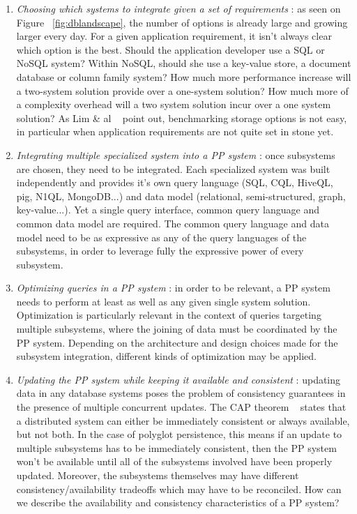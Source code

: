 \begin{enumerate}
\item{\emph{Choosing which systems to integrate given a set of requirements} : as seen on Figure ~\ref{fig:dblandscape}, the number of options is already large and growing larger every day. For a given application requirement, it isn't always clear which option is the best. Should the application developer use a SQL or NoSQL system? Within NoSQL, should she use a key-value store, a document database or column family system? How much more performance increase will a two-system solution provide over a one-system solution? How much more of a complexity overhead will a two system solution incur over a one system solution? As Lim \& al ~\cite{Lim2013}  point out, benchmarking storage options is not easy, in particular when application requirements are not quite set in stone yet.}
\item{\emph{Integrating multiple specialized system into a PP system} : once subsystems are chosen, they need to be integrated. Each specialized system was built independently and provides it's own query language (SQL, CQL, HiveQL, pig, N1QL, MongoDB...) and data model (relational, semi-structured, graph, key-value...). Yet a single query interface, common query language and common data model are required. The common query language and data model need to be as expressive as any of the query languages of the subsystems, in order to leverage fully the expressive power of every subsystem. }
\item{\emph{Optimizing queries in a PP system} :  in order to be relevant, a PP system needs to perform at least as well as any given single system solution. Optimization is particularly relevant in the context of queries targeting multiple subsystems, where the joining of data must be coordinated by the PP system. Depending on the architecture and design choices made for the subsystem integration, different kinds of optimization may be applied.}
\item{\emph{Updating the PP system while keeping it available and consistent} : updating data in any database systems poses the problem of consistency guarantees in the presence of multiple concurrent updates. The CAP theorem ~\cite{Gilbert2002} states that a distributed system can either be immediately consistent or always available, but not both. In the case of polyglot persistence, this means if an update to multiple subsystems has to be immediately consistent, then the PP system won't be available until all of the subsystems involved have been properly updated. Moreover, the subsystems themselves may have different consistency/availability tradeoffs which may have to be reconciled. How can we describe the availability and consistency characteristics of a PP system?}

\end{enumerate}
